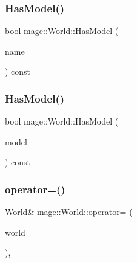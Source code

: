 \hypertarget{classmage_1_1_world_a381e0a56fc1ba6d0955a248f7b0f0c22}{}\label{classmage_1_1_world_a381e0a56fc1ba6d0955a248f7b0f0c22} 
\subsubsection{\texorpdfstring{Has\+Model()}{HasModel()}\hspace{0.1cm}{\footnotesize\ttfamily [1/2]}}
{\footnotesize\ttfamily bool mage\+::\+World\+::\+Has\+Model (\begin{DoxyParamCaption}\item[{const string \&}]{name }\end{DoxyParamCaption}) const}

\hypertarget{classmage_1_1_world_a821d420241b2a94502b20e24595490df}{}\label{classmage_1_1_world_a821d420241b2a94502b20e24595490df} 
\subsubsection{\texorpdfstring{Has\+Model()}{HasModel()}\hspace{0.1cm}{\footnotesize\ttfamily [2/2]}}
{\footnotesize\ttfamily bool mage\+::\+World\+::\+Has\+Model (\begin{DoxyParamCaption}\item[{const \hyperlink{namespacemage_a1e01ae66713838a7a67d30e44c67703e}{Shared\+Ptr}$<$ \hyperlink{classmage_1_1_model}{Model} $>$}]{model }\end{DoxyParamCaption}) const}

\hypertarget{classmage_1_1_world_aa7074e3847c9fbe1466aa833f194eed0}{}\label{classmage_1_1_world_aa7074e3847c9fbe1466aa833f194eed0} 
\subsubsection{\texorpdfstring{operator=()}{operator=()}\hspace{0.1cm}{\footnotesize\ttfamily [1/2]}}
{\footnotesize\ttfamily \hyperlink{classmage_1_1_world}{World}\& mage\+::\+World\+::operator= (\begin{DoxyParamCaption}\item[{const \hyperlink{classmage_1_1_world}{World} \&}]{world }\end{DoxyParamCaption})\hspace{0.3cm}{\ttfamily [private]}, {\ttfamily [delete]}}

